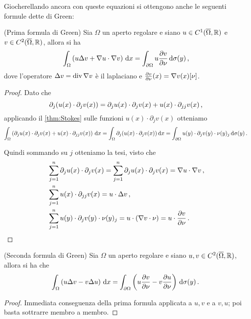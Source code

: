 Giocherellando ancora con queste equazioni si ottengono anche le seguenti formule dette di Green:

\begin{corollary}(Prima formula di Green)
	Sia $\Omega$ un aperto regolare e siano $u\in C^1(\overline\Omega, \mathbb R)$ e $v\in C^2(\overline\Omega, \mathbb R)$, allora si ha
	\[
		\int_{\Omega} \left( u \Delta v+ \nabla u\cdot\nabla v \right) \,\mathrm d x=
		\int_{\partial\Omega} u \frac{\partial v}{\partial \nu} \,\mathrm d \sigma(y) \, \text{, }
	\]
	dove l'operatore $\Delta v = \operatorname{div} \nabla v$ è il laplaciano e $\frac{\partial v}{\partial \nu}(x)=\nabla v(x)[\nu]$.
\end{corollary}
\begin{proof}
	Dato che
	\begin{equation*}
		\partial_j (u(x)\cdot\partial_j v(x) ) = \partial_j u(x)\cdot \partial_j v(x) + u(x)\cdot\partial_{jj} v(x)\, \text{, }
	\end{equation*}
	applicando il \cref{thm:Stokes} sulle funzioni $u(x)\cdot\partial_j v(x)$ otteniamo
	\[
		\int_{\Omega} \left(\partial_j u(x)\cdot \partial_j v(x) + u(x)\cdot\partial_{jj} v(x) \right)\,\mathrm d x = 
		\int_{\Omega} \partial_j (u(x)\cdot\partial_j v(x)) \,\mathrm d x =
		\int_{\partial \Omega} u(y)\cdot\partial_j v(y)\cdot\nu(y)_j \,\mathrm d \sigma(y)\, \text{. }
	\]
	
	Quindi sommando su $j$ otteniamo la tesi, visto che
	\begin{align*}
		&\sum_{j=1}^n \partial_j u(x) \cdot\partial_j v(x) = \sum_{j=1}^n \partial_j u(x) \cdot\partial_j v(x) = \nabla u\cdot\nabla v \, \text{, }\\
		&\sum_{j=1}^n u(x)\cdot\partial_{jj} v(x) = u \cdot\Delta v\, \text{, }\\
		&\sum_{j=1}^n u(y)\cdot\partial_j v(y)\cdot\nu(y)_j = u\cdot (\nabla v\cdot \nu)=u \cdot\frac{\partial v}{\partial \nu}\, \text{. }
	\end{align*}
\end{proof}

\begin{corollary}(Seconda formula di Green)
	Sia $\Omega$ un aperto regolare e siano $u,v\in C^2(\overline\Omega, \mathbb R)$, allora si ha che
	\[
		\int_{\Omega}\left(u\Delta v-v\Delta u\right) \,\mathrm d x=
		\int_{\partial\Omega}\left(u\frac{\partial v}{\partial\nu}-v\frac{\partial u}{\partial\nu}\right) \,\mathrm d \sigma(y)\, \text{. }
	\]
\end{corollary}

\begin{proof}
	Immediata conseguenza della prima formula applicata a $u,v$ e a $v,u$; poi basta sottrarre membro a membro.
\end{proof}


